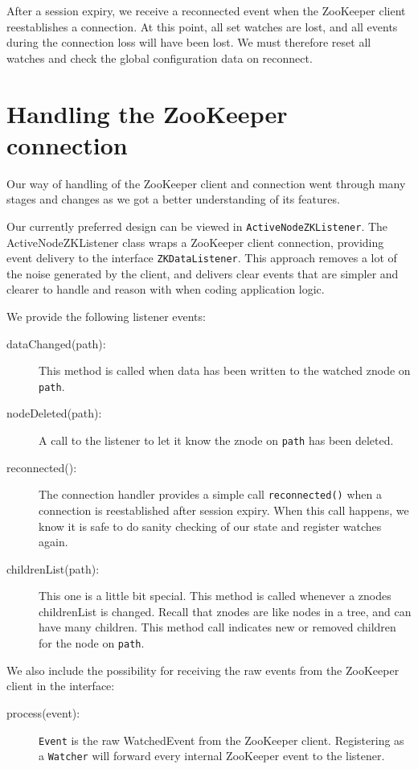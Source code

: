 After a session expiry, we receive a reconnected event when the ZooKeeper client reestablishes a connection. At this point, all set watches are lost, and all events during the connection loss will have been lost. We must therefore reset all watches and check the global configuration data on reconnect. 

\section{Handling the ZooKeeper connection}
Our way of handling of the ZooKeeper client and connection went through many stages and changes as we got a better understanding of its features.

Our currently preferred design can be viewed in \texttt{ActiveNodeZKListener}.
The ActiveNodeZKListener class wraps a ZooKeeper client connection, providing event delivery to the interface \texttt{ZKDataListener}. 
This approach removes a lot of the noise generated by the client, and delivers clear events that are simpler and clearer to handle and reason with when coding application logic.

We provide the following listener events:
\begin{description}

	\item[dataChanged(path):] 
		This method is called when data has been written to the watched znode on \texttt{path}.
	\item[nodeDeleted(path):] 
		A call to the listener to let it know the znode on \texttt{path} has been deleted.
	\item[reconnected():] 
		The connection handler provides a simple call \texttt{reconnected()} when a connection is reestablished after session expiry. When this call happens, we know it is safe to do sanity checking of our state and register watches again.
	\item[childrenList(path):]
		This one is a little bit special. This method is called whenever a znodes childrenList is changed. Recall that znodes are like nodes in a tree, and can have many children. This method call indicates new or removed children for the node on \texttt{path}.

\end{description}

We also include the possibility for receiving the raw events from the ZooKeeper client in the interface:

\begin{description}
	\item[process(event):]
		\texttt{Event} is the raw WatchedEvent from the ZooKeeper client. Registering as a \texttt{Watcher} will forward every internal ZooKeeper event to the listener.

\end{description}


